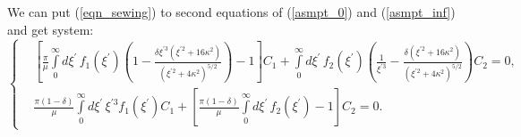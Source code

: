 \documentclass[10pt]{article}
\begin{document}
We can put (\ref{eqn_sewing}) to second equations of (\ref{asmpt_0}) and (\ref{asmpt_inf}) and get system:
\begin{equation}
  \left\{
    \begin{aligned}
      &\left[ \frac{\pi}{\mu} \int\limits_0^\infty d \xi^{\prime} \, f_1(\xi^{\prime}) \left( 1 - \frac{\delta \xi^{\prime 3} ( \xi^{\prime 2} + 16 \kappa^2 )}{(\xi^{\prime 2} + 4 \kappa^2)^{5/2}} \right) - 1 \right] C_1 + \int\limits_0^\infty d \xi^{\prime} \, f_2(\xi^{\prime}) \left( \frac{1}{\xi^{\prime 3}} - \frac{\delta ( \xi^{\prime 2} + 16 \kappa^2 )}{(\xi^{\prime 2} + 4 \kappa^2)^{5/2}} \right) C_2 = 0, \\
      &\frac{\pi (1-\delta)}{\mu} \int\limits_0^\infty d \xi^{\prime} \, \xi^{\prime 3} f_1(\xi^{\prime}) C_1 + \left[ \frac{\pi (1-\delta)}{\mu} \int\limits_0^\infty d \xi^{\prime} \, f_2(\xi^{\prime}) - 1 \right] C_2 = 0.
    \end{aligned}
  \right.
\end{equation}







\end{document}
